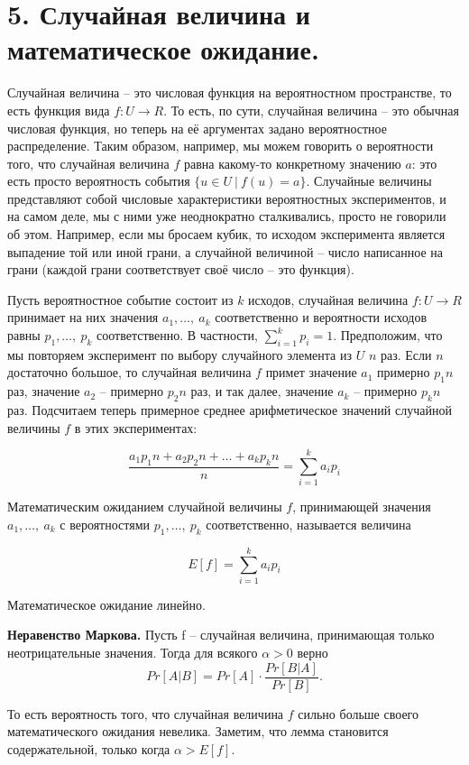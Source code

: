 \section*{5. Случайная величина и математическое ожидание.}

Случайная величина -- это числовая функция на вероятностном пространстве, то есть функция вида $f : U \to R$. То есть, по сути, случайная величина -- это обычная числовая функция, но теперь на её аргументах задано вероятностное распределение. Таким образом, например, мы можем говорить о вероятности того, что случайная
величина $f$ равна какому-то конкретному значению $a$: это есть просто вероятность события $\{u \in U\ |\ f(u) = a \}$. Случайные величины представляют собой числовые характеристики вероятностных экспериментов, и на самом деле, мы с ними уже неоднократно сталкивались, просто не говорили об этом. Например, если мы бросаем кубик, то исходом эксперимента является выпадение той или иной грани, а случайной величиной -- число написанное на грани (каждой грани соответствует своё число -- это функция).

Пусть вероятностное событие состоит из $k$ исходов, случайная величина $f : U \to R$ принимает на них значения $a_1, \ldots ,\ a_k$ соответственно и вероятности исходов равны $p_1, \ldots ,\ p_k$ соответственно. В частности, $\sum\limits_{i = 1}^k p_i = 1$. Предположим, что мы повторяем эксперимент по выбору случайного элемента из $U$ $n$ раз. Если $n$ достаточно большое, то случайная величина $f$ примет значение $a_1$ примерно $p_1n$ раз, значение $a_2$ -- примерно $p_2n$ раз, и так далее, значение $a_k$ -- примерно $p_kn$ раз. Подсчитаем теперь примерное среднее арифметическое значений случайной величины $f$ в этих экспериментах:

\[
\frac{a_1p_1n + a_2p_2n + \ldots + a_kp_kn}{n} = \sum\limits_{i = 1}^k a_ip_i
\]

Математическим ожиданием случайной величины $f$, принимающей значения $a_1, \ldots ,\ a_k$ с вероятностями $p_1, \ldots ,\ p_k$ соответственно, называется величина 

\[
E[f] = \sum\limits_{i = 1}^k a_ip_i
\]

Математическое ожидание линейно. 

\textbf{Неравенство Маркова.} Пусть f -- случайная величина, принимающая только неотрицательные значения. Тогда для всякого $\alpha > 0$ верно 
\[
Pr[A|B] = Pr[A] \cdot \frac{Pr[B|A]}{Pr[B]}.
\]

То есть вероятность того, что случайная величина $f$  сильно больше своего математического ожидания невелика. Заметим, что лемма становится содержательной, только когда $\alpha > E[f]$.


